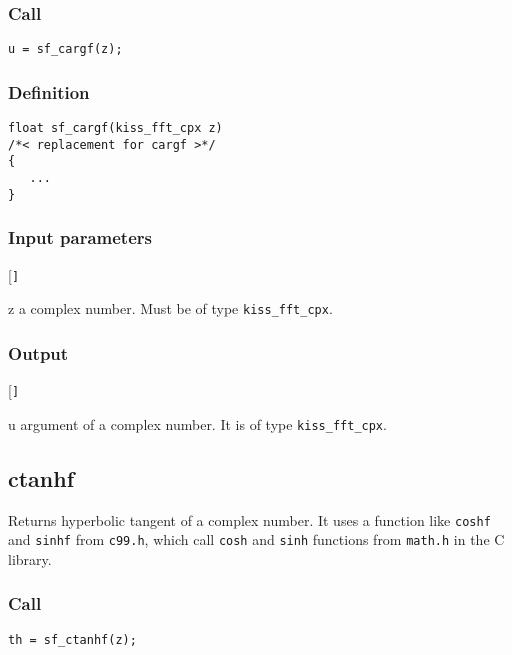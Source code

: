 \subsubsection*{Call}
\begin{verbatim}u = sf_cargf(z);\end{verbatim}

\subsubsection*{Definition}
\begin{verbatim}
float sf_cargf(kiss_fft_cpx z)
/*< replacement for cargf >*/
{
   ...
}
\end{verbatim}

\subsubsection*{Input parameters}
\begin{desclist}{\tt }{\quad}[\tt ]
   \setlength\itemsep{0pt}
   \item[z] a complex number. Must be of type \texttt{kiss\_fft\_cpx}.
\end{desclist}

\subsubsection*{Output}
\begin{desclist}{\tt }{\quad}[\tt ]
   \setlength\itemsep{0pt}
   \item[u] argument of a complex number. It is of type \texttt{kiss\_fft\_cpx}.
\end{desclist}




\subsection{{ctanhf}}
Returns hyperbolic tangent of a complex number. It uses a function
like \texttt{coshf} and \texttt{sinhf} from \texttt{c99.h}, which call \texttt{cosh} and \texttt{sinh} functions from \texttt{math.h} in the C library.

\subsubsection*{Call}
\begin{verbatim}th = sf_ctanhf(z);\end{verbatim}

